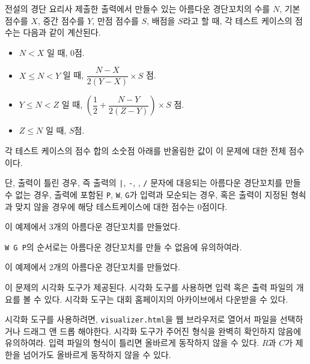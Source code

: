 \begin{problem}{전설의 경단 요리사}
제출한 출력에서 만들수 있는 아름다운 경단꼬치의 수를 $N$, 기본 점수를 $X$, 중간 점수를 $Y$, 만점 점수를 $S$, 배점을 $S$라고 할 때, 각 테스트 케이스의 점수는 다음과 같이 계산된다.

\begin{itemize}
	\item $N<X$ 일 때, $0$점.
	\item $X \le N < Y$ 일 때, $\dfrac{N-X}{2(Y-X)} \times S$ 점.
	\item $Y \le N < Z$ 일 때, $\left(\dfrac{1}{2} + \dfrac{N-Y}{2(Z-Y)} \right) \times S$ 점.
	\item $Z \le N$ 일 때, $S$점.
\end{itemize}

각 테스트 케이스의 점수 합의 소숫점 아래를 반올림한 값이 이 문제에 대한 전체 점수이다. 

단, 출력이 틀린 경우, 즉 출력의 \texttt{|}, \texttt{-}, \texttt{}, \texttt{/} 문자에 대응되는 아름다운 경단꼬치를 만들 수 없는 경우, 출력에 포함된 \texttt{P}, \texttt{W}, \texttt{G}가 입력과 모순되는 경우, 혹은 출력이 지정된 형쇡과 맞지 않을 경우에 해당 테스트케이스에 대한 점수는 0점이다.


\Examples


\renewcommand{\InputFileName}{Sample Input}
\renewcommand{\OutputFileName}{Sample Output}

\begin{example}
\end{example}

이 예제에서 3개의 아름다운 경단꼬치를 만들었다.

\texttt{W G P}의 순서로는 아름다운 경단꼬치를 만들 수 없음에 유의하여라.

\begin{example}
\end{example}

이 예제에서 2개의 아름다운 경단꼬치를 만들었다.


\Visualizer

이 문제의 시각화 도구가 제공된다. 시각화 도구를 사용하면 입력 혹은 출력 파일의 개요를 볼 수 있다. 시각화 도구는 대회 홈페이지의 아카이브에서 다운받을 수 있다.

시각화 도구를 사용하려면, \texttt{visualizer.html}을 웹 브라우저로 열어서 파일을 선택하거나 드래그 앤 드롭 해야한다. 시각화 도구가 주어진 형식을 완벽히 확인하지 않음에 유의하여라. 입력 파일의 형식이 틀리면 올바르게 동작하지 않을 수 있다. $R$과 $C$가 제한을 넘어가도 올바르게 동작하지 않을 수 있다.


\end{problem}

